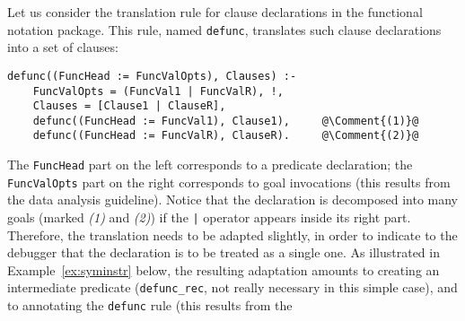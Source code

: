 \documentclass[preprint]{llncs}
\newcommand*{\Comment}[1]{\hfill\makebox[6.0cm][l]{\rm\it \color{red!70!black}#1}}\newcommand*{\Var}[1]{{\tt\textup{#1}}}
\newcommand{\pre}[1]{\texttt{#1}}
\begin{document}
\begin{example}
\label{ex:instr}
Let us consider the translation rule for clause declarations in the
functional notation package. This rule, named \pre{defunc}, translates
such clause declarations into a set of clauses:
\begin{lstlisting}[frame=none,escapechar=@,numbers=none]
defunc((FuncHead := FuncValOpts), Clauses) :- 
    FuncValOpts = (FuncVal1 | FuncValR), !, 
    Clauses = [Clause1 | ClauseR],
    defunc((FuncHead := FuncVal1), Clause1),     @\Comment{(1)}@
    defunc((FuncHead := FuncValR), ClauseR).     @\Comment{(2)}@
\end{lstlisting}
\end{example}

The \pre{FuncHead} part on the left corresponds to a predicate
declaration; the \pre{FuncValOpts} part on the right corresponds to
goal invocations (this results from the data analysis guideline).
Notice that the declaration is decomposed into many goals (marked
\emph{(1)} and \emph{(2)}) if the \pre{|} operator appears inside its
right part. Therefore, the translation needs to be adapted slightly,
in order to indicate to the debugger that the declaration is to be
treated as a single one. As illustrated in Example~\ref{ex:syminstr}
below, the resulting adaptation amounts to creating an intermediate
predicate (\pre{defunc\_rec}, not really necessary in this simple
case), and to annotating the \pre{defunc} rule (this results from the
\end{document}
